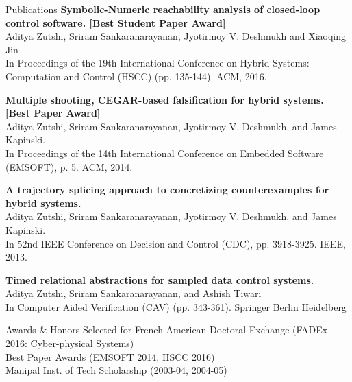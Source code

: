 \begin{rSection}{Publications}
\textbf{Symbolic-Numeric reachability analysis of closed-loop control software. [Best Student Paper Award]}\\
Aditya Zutshi, Sriram Sankaranarayanan, Jyotirmoy V. Deshmukh and Xiaoqing Jin\\
In Proceedings of the 19th International Conference on Hybrid Systems: Computation and Control (HSCC) (pp. 135-144). ACM, 2016.

\textbf{Multiple shooting, CEGAR-based falsification for hybrid systems. [Best Paper Award]}\\
Aditya Zutshi, Sriram Sankaranarayanan, Jyotirmoy V. Deshmukh, and James Kapinski.\\
In Proceedings of the 14th International Conference on Embedded Software (EMSOFT), p. 5. ACM, 2014.

\textbf{A trajectory splicing approach to concretizing counterexamples for hybrid systems.}\\
Aditya Zutshi, Sriram Sankaranarayanan, Jyotirmoy V. Deshmukh, and James Kapinski.\\
In 52nd IEEE Conference on Decision and Control (CDC), pp. 3918-3925. IEEE, 2013.

\textbf{Timed relational abstractions for sampled data control systems.}\\
Aditya Zutshi, Sriram Sankaranarayanan, and Ashish Tiwari\\
In Computer Aided Verification (CAV) (pp. 343-361). Springer Berlin Heidelberg

\end{rSection}


\begin{rSection}{Awards \& Honors}
Selected for French-American Doctoral Exchange (FADEx 2016: Cyber-physical Systems)\\
Best Paper Awards (EMSOFT 2014, HSCC 2016)\\
Manipal Inst. of Tech Scholarship (2003-04, 2004-05)
\end{rSection}

